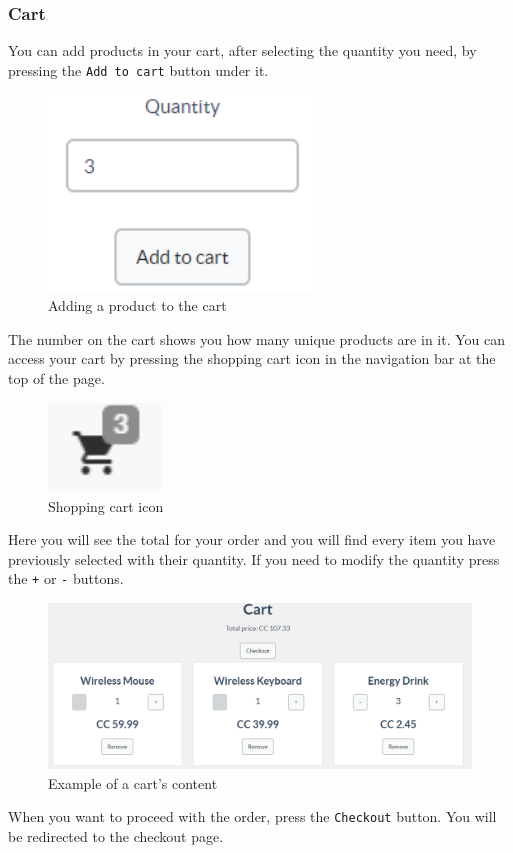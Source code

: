 		\subsubsection{Cart}
		You can add products in your cart, after selecting the quantity you need, 
		by pressing the \texttt{Add to cart} button under it.
	\begin{figure}[H]
		\includegraphics[width=7cm]{res/images/add_to_cart.png}
		\centering
		\caption{Adding a product to the cart}
	\end{figure}
	\noindent The number on the cart shows you how many unique products are 
	in it. You can access your cart by pressing the shopping cart icon in 
	the navigation bar at the top of the page.
	\begin{figure}[H]
		\includegraphics[width=3cm]{res/images/cart_icon.png}
		\centering
		\caption{Shopping cart icon}
	\end{figure}
	\noindent Here you will see the total for your order and you will find 
	every item you have previously selected with their quantity. If you 
	need to modify the quantity press the \texttt{+} or \texttt{-} buttons.
	\begin{figure}[H]
		\includegraphics[width=15cm]{res/images/cart_example.png}
		\centering
		\caption{Example of a cart's content}
	\end{figure}
	\noindent When you want to proceed with the order, press the \texttt{Checkout} button. 
	You will be redirected to the checkout page.
